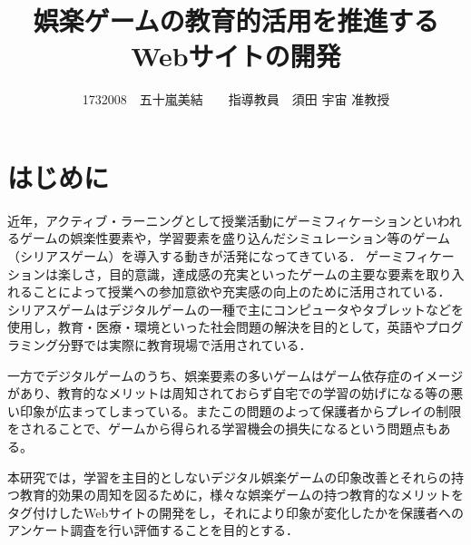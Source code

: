 \documentclass[twocolumn,10pt,a4j]{ltjsarticle}
\title{娯楽ゲームの教育的活用を推進するWebサイトの開発}
\author{1732008　五十嵐美結　　指導教員　須田 宇宙 准教授}
\date{}
\begin{document}
\maketitle

\section{はじめに}\label{introduction}

近年，アクティブ・ラーニングとして授業活動にゲーミフィケーションといわれるゲームの娯楽性要素や，学習要素を盛り込んだシミュレーション等のゲーム（シリアスゲーム）を導入する動きが活発になってきている．
ゲーミフィケーションは楽しさ，目的意識，達成感の充実といったゲームの主要な要素を取り入れることによって授業への参加意欲や充実感の向上のために活用されている．
シリアスゲームはデジタルゲームの一種で主にコンピュータやタブレットなどを使用し，教育・医療・環境といった社会問題の解決を目的として，英語やプログラミング分野では実際に教育現場で活用されている．

一方でデジタルゲームのうち、娯楽要素の多いゲームはゲーム依存症のイメージがあり、教育的なメリットは周知されておらず自宅での学習の妨げになる等の悪い印象が広まってしまっている。またこの問題のよって保護者からプレイの制限をされることで、ゲームから得られる学習機会の損失になるという問題点もある。




本研究では，学習を主目的としないデジタル娯楽ゲームの印象改善とそれらの持つ教育的効果の周知を図るために，様々な娯楽ゲームの持つ教育的なメリットをタグ付けしたWebサイトの開発をし，それにより印象が変化したかを保護者へのアンケート調査を行い評価することを目的とする．
\end{document}
